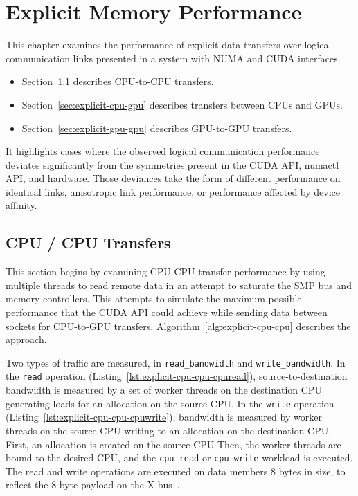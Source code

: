 \chapter{Explicit Memory Performance}
\label{ch:explicit}

This chapter examines the performance of explicit data transfers over logical communication links presented in a system with NUMA and CUDA interfaces.
\begin{itemize}
	\item Section~\ref{sec:explicit-cpu-cpu} describes CPU-to-CPU transfers.
	\item Section~\ref{sec:explicit-cpu-gpu} describes transfers between CPUs and GPUs.
	\item Section~\ref{sec:explicit-gpu-gpu} describes GPU-to-GPU transfers.
\end{itemize}
It highlights cases where the observed logical communication performance deviates significantly from the symmetries present in the CUDA API, numactl API, and hardware.
Those deviances take the form of different performance on identical links, anisotropic link performance, or performance affected by device affinity.

\section{CPU / CPU Transfers}
\label{sec:explicit-cpu-cpu}

This section begins by examining CPU-CPU transfer performance by using multiple threads to read remote data in an attempt to saturate the SMP bus and memory controllers.
This attempts to simulate the maximum possible performance that the CUDA API could achieve while sending data between sockets for CPU-to-GPU transfers.
Algorithm~\ref{alg:explicit-cpu-cpu} describes the approach.

Two types of traffic are measured, in \texttt{read\_bandwidth} and \texttt{write\_bandwidth}.
In the \texttt{read} operation (Listing~\ref{lst:explicit-cpu-cpu-cpuread}), source-to-destination bandwidth is measured by a set of worker threads on the destination CPU generating loads for an allocation on the source CPU.
In the \texttt{write} operation (Listing~\ref{lst:explicit-cpu-cpu-cpuwrite}), bandwidth is measured by worker threads on the source CPU writing to an allocation on the destination CPU.
First, an allocation is created on the source CPU
Then, the worker threads are bound to the desired CPU, and the \texttt{cpu\_read} or \texttt{cpu\_write} workload is executed.
The read and write operations are executed on data members 8 bytes in size, to reflect the 8-byte payload on the X bus~\cite{caldeira2016s822lc}.

